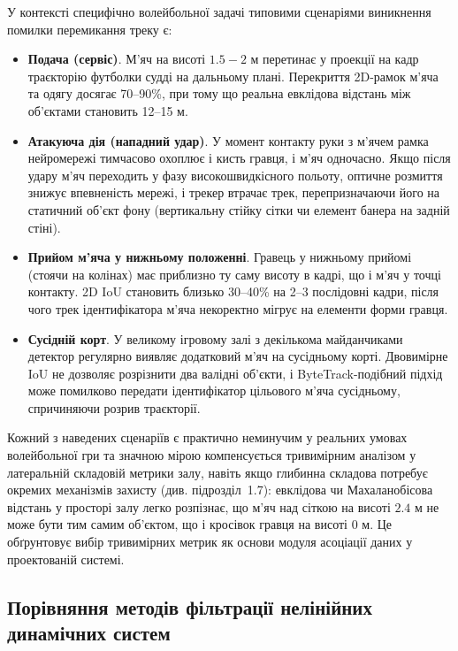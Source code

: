 У контексті специфічно волейбольної задачі типовими сценаріями виникнення
помилки перемикання треку є:
\begin{itemize}
    \item \textbf{Подача (сервіс)}. М'яч на висоті $1.5-2$ м перетинає у проекції на
    кадр траєкторію футболки судді на дальньому плані. Перекриття 2D-рамок
    м'яча та одягу досягає 70--90\%, при тому що реальна евклідова відстань
    між об'єктами становить 12--15 м.
    \item \textbf{Атакуюча дія (нападний удар)}. У момент контакту руки з м'ячем рамка
    нейромережі тимчасово охоплює і кисть гравця, і м'яч одночасно. Якщо
    після удару м'яч переходить у фазу високошвидкісного польоту, оптичне розмиття
    знижує впевненість мережі, і трекер втрачає трек, перепризначаючи його
    на статичний об'єкт фону (вертикальну стійку сітки чи елемент банера на
    задній стіні).
    \item \textbf{Прийом м'яча у нижньому положенні}. Гравець у нижньому
    прийомі (стоячи на колінах) має приблизно ту саму висоту в кадрі, що і
    м'яч у точці контакту. 2D \gls{IoU} становить близько 30--40\% на 2--3
    послідовні кадри, після чого трек ідентифікатора м'яча некоректно
    мігрує на елементи форми гравця.
    \item \textbf{Сусідній корт}. У великому ігровому залі з декількома
    майданчиками детектор регулярно виявляє додатковий м'яч на сусідньому
    корті. Двовимірне \gls{IoU} не дозволяє розрізнити два валідні об'єкти,
    і ByteTrack-подібний підхід може помилково передати ідентифікатор
    цільового м'яча сусідньому, спричиняючи розрив траєкторії.
\end{itemize}

Кожний з наведених сценаріїв є практично неминучим у реальних умовах волейбольної гри
та значною мірою компенсується тривимірним аналізом у латеральній складовій метрики залу,
навіть якщо глибинна складова потребує окремих механізмів захисту (див. підрозділ~1.7):
евклідова чи Махаланобісова відстань у просторі залу легко розпізнає, що м'яч над сіткою
на висоті $2.4$ м не може бути тим самим об'єктом, що і кросівок гравця на висоті $0$ м.
Це обґрунтовує вибір тривимірних метрик як основи модуля асоціації даних у проектованій системі.

\subsection{Порівняння методів фільтрації нелінійних динамічних систем}

